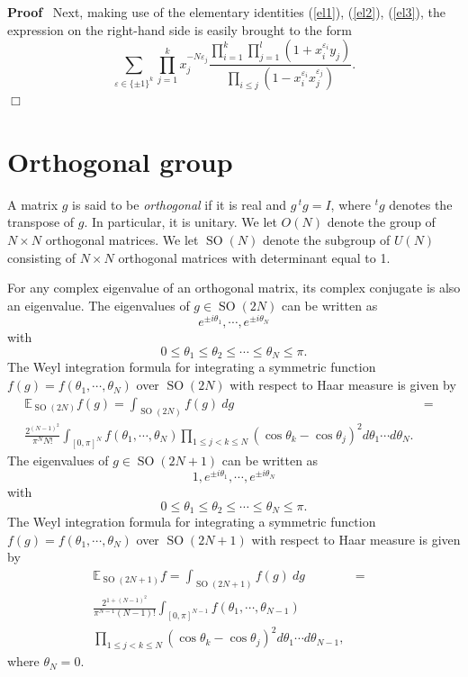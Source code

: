 \documentclass[11pt]{amsart}
\newcommand{\tmem}[1]{{\em #1\/}}
\newcommand{\tmop}[1]{\ensuremath{\operatorname{#1}}}
\renewenvironment{proof}{
\noindent\textbf{Proof}\ }{\hspace*{\fill}
\begin{math}\Box\end{math}\medskip}
\begin{document}
\begin{proof}
  Next, making use of the elementary identities (\ref{el1}), (\ref{el2}),
  (\ref{el3}), the expression on the right-hand side is easily brought to the
  form
  \[ \sum_{\varepsilon \in \{ \pm 1 \}^k} \prod_{j = 1}^k x_j^{- N
     \varepsilon_j} \frac{\prod_{i = 1}^k \prod_{j = 1}^l ( 1 +
     x_i^{\varepsilon_i} y_j )}{\prod_{i \leqslant j} ( 1 -
     x_i^{\varepsilon_i} x_j^{\varepsilon_j} )} . \]
\end{proof}

\section{Orthogonal group} \label{sec:o}

A matrix $g$ is said to be {\tmem{orthogonal}} if it is real and
$g \, {^t g} = I$, where $^t g$ denotes the transpose of $g$. In
particular, it is unitary. We let $O ( N )$ denote the group of $N
\times N$ orthogonal matrices. We let $\tmop{SO} ( N )$ denote the
subgroup of $U ( N )$ consisting of $N \times N$ orthogonal
matrices with determinant equal to 1.

For any complex eigenvalue of an orthogonal matrix, its complex
conjugate is also an eigenvalue. The eigenvalues of $g \in
\tmop{SO} ( 2 N )$ can be written as
\[ e^{\pm i \theta_1}, \cdots, e^{\pm i \theta_N} \]
with
\[ 0 \leqslant \theta_1 \leqslant \theta_2 \leqslant \cdots \leqslant \theta_N
   \leqslant \pi . \]
The Weyl integration formula {\cite{weyl}} for integrating a
symmetric function $f ( g ) = f ( \theta_1, \cdots, \theta_N )$
over $\tmop{SO} ( 2 N )$ with respect to Haar measure is given by
\begin{eqnarray*}
  \mathbb{E}_{\tmop{SO} ( 2 N )} f ( g ) = \int_{\tmop{SO} ( 2 N )} f ( g ) ~
  dg & = & \\
  \frac{2^{( N - 1 )^2}}{\pi^N N!} \int_{[ 0, \pi ]^N} f ( \theta_1, \cdots,
  \theta_N ) \prod_{1 \leqslant j < k \leqslant N} ( \cos \theta_k - \cos
  \theta_j )^2 d \theta_1 \cdots d \theta_N . &  &
\end{eqnarray*}
The eigenvalues of $g \in \tmop{SO} ( 2 N + 1 )$ can be written as
\[ 1, e^{\pm i \theta_1}, \cdots, e^{\pm i \theta_N} \]
with
\[ 0 \leqslant \theta_1 \leqslant \theta_2 \leqslant \cdots \leqslant \theta_N
   \leqslant \pi . \]
The Weyl integration formula {\cite{weyl}} for integrating a
symmetric function $f ( g ) = f ( \theta_1, \cdots, \theta_N )$
over $\tmop{SO} ( 2 N + 1 )$ with respect to Haar measure is given
by
\begin{eqnarray*}
  \mathbb{E}_{\tmop{SO} ( 2 N + 1 )} f = \int_{\tmop{SO} ( 2 N + 1 )} f ( g )
  ~ dg & = & \\
  \frac{2^{1 + ( N - 1 )^2}}{\pi^{N - 1} ( N - 1 ) !} \int_{[ 0, \pi ]^{N -
  1}} f ( \theta_1, \cdots, \theta_{N - 1} ) &  & \\
  \prod_{1 \leqslant j < k \leqslant N} ( \cos \theta_k - \cos \theta_j )^2 d
  \theta_1 \cdots d \theta_{N - 1}, &  &
\end{eqnarray*}
where $\theta_N = 0$.
\end{document}
